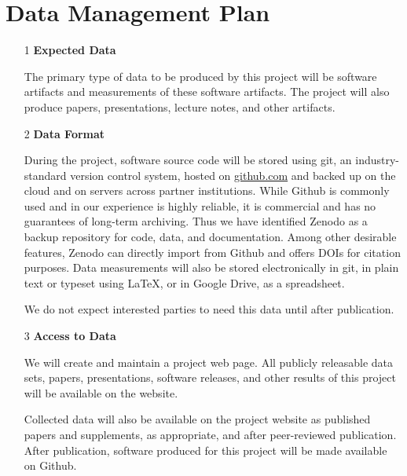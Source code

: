 


\thispagestyle{empty}
\section*{Data Management Plan}

\label{sec:datamgmt}

\begin{enumerate}
\item [1] \textbf{Expected Data}

The primary type of data to be produced by this project will be
software artifacts and measurements of these software artifacts.
The project will also produce papers, presentations, lecture notes,
and other artifacts.
\item [2] \textbf{Data Format}

During the project, software source code will be stored using git, an industry-standard
version control system, hosted on \url{github.com} and
backed up on the cloud and
on servers across partner institutions. While Github is commonly used and in our experience is highly reliable, it is commercial and has no guarantees of long-term archiving. Thus we have identified Zenodo as a backup repository for code, data, and documentation. Among other desirable features, Zenodo can directly import from Github and offers DOIs for citation purposes.
%
Data measurements
will also be stored electronically in git,
in plain text or typeset using \LaTeX, or in Google
Drive, as a spreadsheet.

We do not expect interested parties to need this data until after publication.

\item [3] \textbf{Access to Data}

We will create and maintain a project web page. %
All publicly releasable data sets,
papers, presentations, software releases, and other results of this
project will be available on the website.

Collected data will also be available on the project website as published
papers and supplements, as appropriate, and after peer-reviewed
publication.
After publication, software produced for this project will be
made available on Github.



\end{enumerate}
